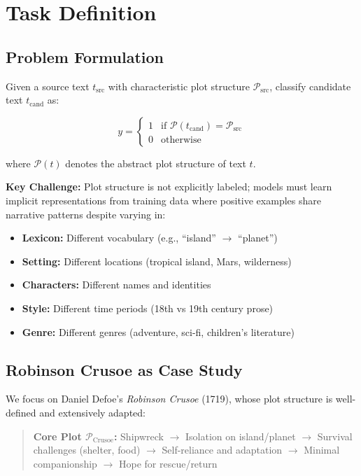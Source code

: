 \documentclass[11pt]{article}
\begin{document}
\section{Task Definition}

\subsection{Problem Formulation}

Given a source text $t_{\text{src}}$ with characteristic plot structure $\mathcal{P}_{\text{src}}$, classify candidate text $t_{\text{cand}}$ as:

\begin{equation}
y = \begin{cases}
1 & \text{if } \mathcal{P}(t_{\text{cand}}) = \mathcal{P}_{\text{src}} \\
0 & \text{otherwise}
\end{cases}
\end{equation}

where $\mathcal{P}(t)$ denotes the abstract plot structure of text $t$.

\textbf{Key Challenge:} Plot structure is not explicitly labeled; models must learn implicit representations from training data where positive examples share narrative patterns despite varying in:

\begin{itemize}
    \item \textbf{Lexicon:} Different vocabulary (e.g., ``island'' $\rightarrow$ ``planet'')
    \item \textbf{Setting:} Different locations (tropical island, Mars, wilderness)
    \item \textbf{Characters:} Different names and identities
    \item \textbf{Style:} Different time periods (18th vs 19th century prose)
    \item \textbf{Genre:} Different genres (adventure, sci-fi, children's literature)
\end{itemize}

\subsection{Robinson Crusoe as Case Study}

We focus on Daniel Defoe's \textit{Robinson Crusoe} (1719), whose plot structure is well-defined and extensively adapted:

\begin{quote}
\small
\textbf{Core Plot $\mathcal{P}_{\text{Crusoe}}$:} Shipwreck $\rightarrow$ Isolation on island/planet $\rightarrow$ Survival challenges (shelter, food) $\rightarrow$ Self-reliance and adaptation $\rightarrow$ Minimal companionship $\rightarrow$ Hope for rescue/return
\end{quote}
\end{document}
